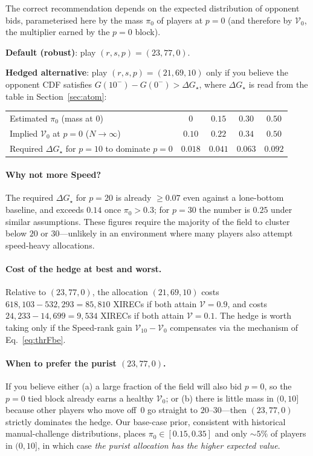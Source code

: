 \documentclass[11pt,a4paper]{article}
\theoremstyle{definition}
\theoremstyle{remark}
\newcommand{\Sp}{\mathcal{V}}
\begin{document}
The correct recommendation depends on the expected distribution of opponent
bids, parameterised here by the mass \(\pi_0\) of players at \(p=0\) (and
therefore by \(\Sp_0\), the multiplier earned by the \(p=0\) block).

\begin{recbox}
\textbf{Default (robust)}: play \(\boxed{(r,s,p)=(23,77,0)}\).

\textbf{Hedged alternative}: play \(\boxed{(r,s,p)=(21,69,10)}\) only if you
believe the opponent CDF satisfies \(G(10^{-})-G(0^{-}) > \Delta G_\star\),
where \(\Delta G_\star\) is read from the table in Section~\ref{sec:atom}:
\begin{center}
\begin{tabular}{l c c c c}
\toprule
Estimated \(\pi_0\) (mass at \(0\)) & \(0\) & \(0.15\) & \(0.30\) & \(0.50\) \\
Implied \(\Sp_0\) at \(p=0\) (\(N\!\to\!\infty\)) & \(0.10\) & \(0.22\) & \(0.34\) & \(0.50\) \\
Required \(\Delta G_\star\) for \(p=10\) to dominate \(p=0\) & \(0.018\) & \(0.041\) & \(0.063\) & \(0.092\) \\
\bottomrule
\end{tabular}
\end{center}
\end{recbox}

\paragraph{Why not more Speed?} The required \(\Delta G_\star\) for \(p=20\)
is already \(\ge 0.07\) even against a lone-bottom baseline, and exceeds
\(0.14\) once \(\pi_0>0.3\); for \(p=30\) the number is \(0.25\) under similar
assumptions. These figures require the majority of the field to cluster below
\(20\) or \(30\)---unlikely in an environment where many players also attempt
speed-heavy allocations.

\paragraph{Cost of the hedge at best and worst.}
Relative to \((23,77,0)\), the allocation \((21,69,10)\) costs
\(618{,}103-532{,}293=85{,}810\) XIRECs if both attain \(\Sp=0.9\), and costs
\(24{,}233-14{,}699=9{,}534\) XIRECs if both attain \(\Sp=0.1\). The hedge is
worth taking only if the Speed-rank gain \(\Sp_{10}-\Sp_0\) compensates via the
mechanism of Eq.~\eqref{eq:thrFbe}.

\paragraph{When to prefer the purist \((23,77,0)\).} If you believe either (a)
a large fraction of the field will also bid \(p=0\), so the \(p=0\) tied block
already earns a healthy \(\Sp_0\); or (b) there is little mass in
\((0,10]\) because other players who move off~\(0\) go straight to
\(20\)--\(30\)---then \((23,77,0)\) strictly dominates the hedge. Our base-case
prior, consistent with historical manual-challenge distributions, places
\(\pi_0\in[0.15,0.35]\) and only \(\sim 5\%\) of players in \((0,10]\), in
which case \emph{the purist allocation has the higher expected value}.
\end{document}
